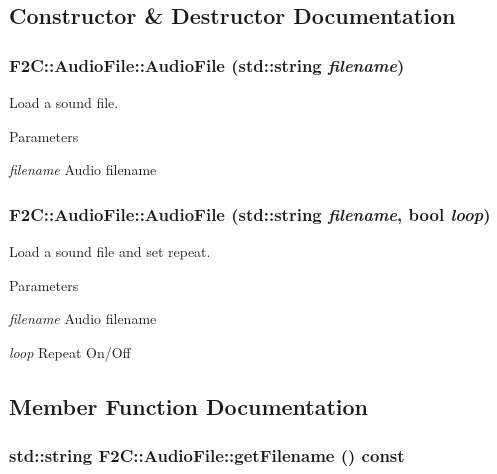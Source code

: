 \subsection{Constructor \& Destructor Documentation}
\hypertarget{class_f2_c_1_1_audio_file_ab577e396b7f73828fe95cf1792f7767a}{
\subsubsection[{AudioFile}]{\setlength{\rightskip}{0pt plus 5cm}F2C::AudioFile::AudioFile (std::string {\em filename})}}
\label{class_f2_c_1_1_audio_file_ab577e396b7f73828fe95cf1792f7767a}


Load a sound file. 
\begin{DoxyParams}{Parameters}
\item[{\em filename}]Audio filename \end{DoxyParams}
\hypertarget{class_f2_c_1_1_audio_file_ac366bc555c69c7e6631747cf3b22af1d}{
\subsubsection[{AudioFile}]{\setlength{\rightskip}{0pt plus 5cm}F2C::AudioFile::AudioFile (std::string {\em filename}, \/  bool {\em loop})}}
\label{class_f2_c_1_1_audio_file_ac366bc555c69c7e6631747cf3b22af1d}


Load a sound file and set repeat. 
\begin{DoxyParams}{Parameters}
\item[{\em filename}]Audio filename \item[{\em loop}]Repeat On/Off \end{DoxyParams}


\subsection{Member Function Documentation}
\hypertarget{class_f2_c_1_1_audio_file_aab2fd2600fd2282972b73b5f5fd60b4b}{
\subsubsection[{getFilename}]{\setlength{\rightskip}{0pt plus 5cm}std::string F2C::AudioFile::getFilename () const}}
\label{class_f2_c_1_1_audio_file_aab2fd2600fd2282972b73b5f5fd60b4b}



